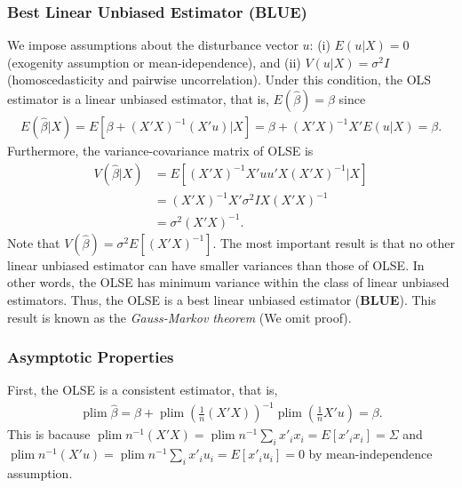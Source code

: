 \documentclass[
  12pt,
]{article}
\begin{document}
\hypertarget{best-linear-unbiased-estimator-blue}{%
\subsubsection{Best Linear Unbiased Estimator (BLUE)}\label{best-linear-unbiased-estimator-blue}}

We impose assumptions about the disturbance vector \(u\):
(i) \(E(u|X) = 0\) (exogenity assumption or mean-idependence),
and (ii) \(V(u|X) = \sigma^2 I\) (homoscedasticity and pairwise uncorrelation).
Under this condition, the OLS estimator is a linear unbiased estimator, that is, \(E(\hat{\beta}) = \beta\) since
\begin{align*}
  E(\hat{\beta}|X) = E[\beta + (X'X)^{-1}(X'u)|X] = \beta + (X'X)^{-1}X'E(u|X) = \beta.
\end{align*}
Furthermore, the variance-covariance matrix of OLSE is
\begin{align*}
  V(\hat{\beta}|X) 
  &= E[(X'X)^{-1}X' uu' X (X'X)^{-1} | X] \\
  &= (X'X)^{-1}X' \sigma^2 I X (X'X)^{-1} \\
  &= \sigma^2 (X'X)^{-1}.
\end{align*}
Note that \(V(\hat{\beta}) = \sigma^2 E[ (X'X)^{-1} ]\).
The most important result is that
no other linear unbiased estimator can have smaller variances than those of OLSE.
In other words, the OLSE has minimum variance within the class of linear unbiased estimators.
Thus, the OLSE is a best linear unbiased estimator (\textbf{BLUE}).
This result is known as the \emph{Gauss-Markov theorem} (We omit proof).

\hypertarget{asymptotic-properties}{%
\subsubsection{Asymptotic Properties}\label{asymptotic-properties}}

First, the OLSE is a consistent estimator, that is,
\begin{align*}
  \mathop{\mathrm{plim}}\hat{\beta} = \beta + \mathop{\mathrm{plim}}\left( \frac{1}{n} (X'X) \right)^{-1} \mathop{\mathrm{plim}}\left( \frac{1}{n} X'u \right) = \beta.
\end{align*}
This is bacause \(\mathop{\mathrm{plim}}n^{-1} (X'X) = \mathop{\mathrm{plim}}n^{-1} \sum_i x'_i x_i = E[x'_i x_i] = \Sigma\)
and \(\mathop{\mathrm{plim}}n^{-1} (X'u) = \mathop{\mathrm{plim}}n^{-1} \sum_i x'_i u_i = E[x'_i u_i] = 0\)
by mean-independence assumption.
\end{document}
